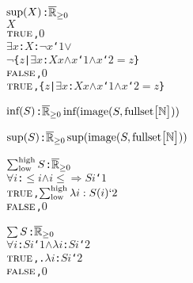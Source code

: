 \begin{alltt}
  \(\xunderscoresuponefn{X}\): \({\pvssubscript{\overline{\mathbb{R}}}{{\geq}0}}\) \pvskey{=}
       \pvsid{(}\(X\)\pvsid{)}
         \pvsid{(}\({\pvskey{TRUE}}\), \(0\)\pvsid{)}
       \pvsid{(}\(\exists\) \pvsid{(}\(x\): \pvsid{(}\(X\)\pvsid{)}\pvsid{)}: \(\neg\) \(x\)`\(1\)\pvsid{)} \(\vee\)
             \(\neg\) \pvsid{(}\{\(z\) | \(\exists\) \(x\): \(X\)\pvsid{(}\(x\)\pvsid{)} \(\wedge\) \(x\)`\(1\) \(\wedge\) \(x\)`\(2\) \(=\) \(z\)\}\pvsid{)}
         \pvsid{(}\({\pvskey{FALSE}}\), \(0\)\pvsid{)}
       \pvsid{(}\({\pvskey{TRUE}}\), \pvsid{(}\{\(z\) | \(\exists\) \(x\): \(X\)\pvsid{(}\(x\)\pvsid{)} \(\wedge\) \(x\)`\(1\) \(\wedge\) \(x\)`\(2\) \(=\) \(z\)\}\pvsid{)}\pvsid{)}
      \vspace*{\pvsdeclspacing}

  \(\xunderscoreinfonefn{S}\): \({\pvssubscript{\overline{\mathbb{R}}}{{\geq}0}}\) \pvskey{=} \(\xunderscoreinfonefn{\pvsid{image}\pvsid{(}S, \pvsid{fullset}{\pvsbracketl}\mathbb{N}{\pvsbracketr}\pvsid{)}}\)\vspace*{\pvsdeclspacing}

  \(\xunderscoresuponefn{S}\): \({\pvssubscript{\overline{\mathbb{R}}}{{\geq}0}}\) \pvskey{=} \(\xunderscoresuponefn{\pvsid{image}\pvsid{(}S, \pvsid{fullset}{\pvsbracketl}\mathbb{N}{\pvsbracketr}\pvsid{)}}\)\vspace*{\pvsdeclspacing}

  \(\xunderscoresigmathreefn{\pvsid{low}}{\pvsid{high}}{S}\): \({\pvssubscript{\overline{\mathbb{R}}}{{\geq}0}}\) \pvskey{=}
       \pvsid{(}\(\forall\) \(i\):  \(\leq\) \(i\) \(\wedge\) \(i\) \(\leq\)  \(\Rightarrow\) \(S\)\pvsid{(}\(i\)\pvsid{)}`\(1\)\pvsid{)}
         \pvsid{(}\({\pvskey{TRUE}}\), \(\sigmathreefn{\pvsid{low}}{\pvsid{high}}{\lambda i: S\pvsid{(}i\pvsid{)}`2}\)\pvsid{)}
       \pvsid{(}\({\pvskey{FALSE}}\), \(0\)\pvsid{)}
      \vspace*{\pvsdeclspacing}

  \(\xunderscoresumonefn{S}\): \({\pvssubscript{\overline{\mathbb{R}}}{{\geq}0}}\) \pvskey{=}
       \pvsid{(}\(\forall\) \(i\): \(S\)\pvsid{(}\(i\)\pvsid{)}`\(1\)\pvsid{)} \(\wedge\) \pvsid{(}\pvsid{(}\(\lambda\) \(i\): \(S\)\pvsid{(}\(i\)\pvsid{)}`\(2\)\pvsid{)}\pvsid{)}
         \pvsid{(}\({\pvskey{TRUE}}\), .\pvsid{(}\pvsid{(}\(\lambda\) \(i\): \(S\)\pvsid{(}\(i\)\pvsid{)}`\(2\)\pvsid{)}\pvsid{)}\pvsid{)}
       \pvsid{(}\({\pvskey{FALSE}}\), \(0\)\pvsid{)}
      \vspace*{\pvsdeclspacing}


\end{alltt}
